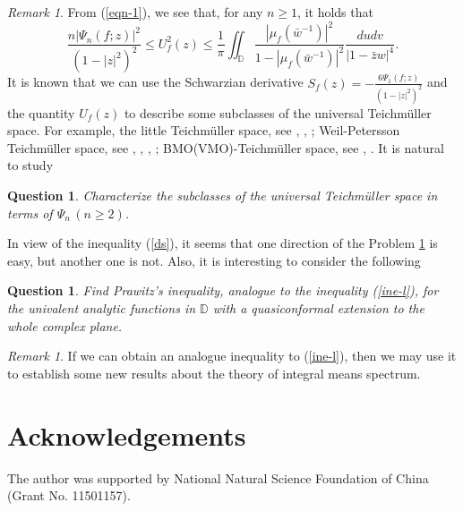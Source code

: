 \documentclass[10pt]{amsart}
\newtheorem{question}[theorem]{Question}
\theoremstyle{definition}
\theoremstyle{remark}
\newtheorem{remark}[theorem]{Remark}
\numberwithin{equation}{section}
\begin{document}
\begin{remark}
From (\ref{eqn-1}),  we see that, for any $n \geq 1$, it holds that
\begin{equation}\label{ds}
\frac{n|\Psi_n(f; z)|^2}{(1-|z|^2)^2}\leq U_f^2(z) \leq \frac{1}{\pi}\iint_{\mathbb{D}} \frac{|\mu_{f}({\bar{w}}^{-1})|^2}{1-|\mu_f({\bar{w}}^{-1})|^2}\frac{dudv}{|1-\bar{z}w|^4}.
\end{equation}
It is known that we can use the Schwarzian derivative $S_f(z)=-\frac{6\Psi_1(f; z)}{(1-|z|^2)^2}$ and the quantity $U_f(z)$ to describe some subclasses of the universal Teichm\"uller space. For example, the little Teichm\"uller space,  see \cite{GS}, \cite{Sh-1}, \cite{Sh-2};  Weil-Petersson Teichm\"uller space, see \cite{B-1}, \cite{Sh-2}, \cite{Sh-3}, \cite{TT}; BMO(VMO)-Teichm\"uller space, see \cite{AZ}, \cite{SW}. It is natural to study 
\begin{question}\label{prob-1}
Characterize the subclasses of the universal Teichm\"uller space in terms of $\Psi_n\,(n\geq 2)$.
\end{question}
\end{remark}
In view of the inequality (\ref{ds}), it seems that one direction of the Problem \ref{prob-1} is easy, but another one is not.  Also, it is interesting to consider the following
\begin{question}
 Find Prawitz's inequality, analogue to the inequality (\ref{ine-l}), for the univalent analytic functions in $\mathbb{D}$ with a quasiconformal extension to the whole complex plane.
\end{question}
\begin{remark}
If we can obtain an analogue inequality to (\ref{ine-l}), then we may use it to establish some new results about the theory of integral means spectrum. 
\end{remark}
\section{{\bf Acknowledgements}}
The author was supported by National Natural Science Foundation of China (Grant No. 11501157). 
\end{document}
